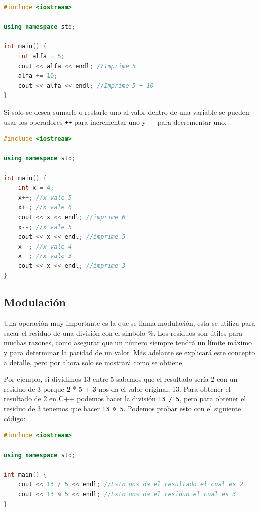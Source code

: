 \documentclass{article}
\begin{document}
\begin{lstlisting}[language=C++, title=Operaciones basicas]
#include <iostream>

using namespace std;

int main() {
	int alfa = 5;
	cout << alfa << endl; //Imprime 5
	alfa += 10;
	cout << alfa << endl; //Imprime 5 + 10
}
\end{lstlisting}

Si solo se desea sumarle o restarle uno al valor dentro de una variable se pueden usar los operadores \lstinline{++} para incrementar uno y \lstinline{--} para decrementar uno.

\begin{lstlisting}[language=C++, title=Incrementos y decrementos]
#include <iostream>

using namespace std;

int main() {
	int x = 4;
	x++; //x vale 5
	x++; //x vale 6
	cout << x << endl; //imprime 6
	x--; //x vale 5
	cout << x << endl; //imprime 5
	x--; //x vale 4
	x--; //x vale 3
	cout << x << endl; //imprime 3
}
\end{lstlisting}

\subsection{Modulación}

Una operación muy importante es la que se llama modulación, esta se utiliza para sacar el residuo de una división con el simbolo \%. Los residuos son útiles para muchas razones, como asegurar que un número siempre tendrá un límite máximo y para determinar la paridad de un valor. Más adelante se explicará este concepto a detalle, pero por ahora solo se mostrará como se obtiene.

Por ejemplo, si dividimos 13 entre 5 sabemos que el resultado sería 2 con un residuo de 3 porque \textbf{2} * 5 + \textbf{3} nos da el valor original, 13. Para obtener el resultado de 2 en C++ podemos hacer la división \lstinline{13 / 5}, pero para obtener el residuo de 3 tenemos que hacer \lstinline{13 % 5}. Podemos probar esto con el siguiente código:

\begin{lstlisting}[language=C++, title=División y modulación]
#include <iostream>

using namespace std;

int main() {
	cout << 13 / 5 << endl; //Esto nos da el resultado el cual es 2
	cout << 13 % 5 << endl; //Esto nos da el residuo el cual es 3
}
\end{lstlisting}
\end{document}
